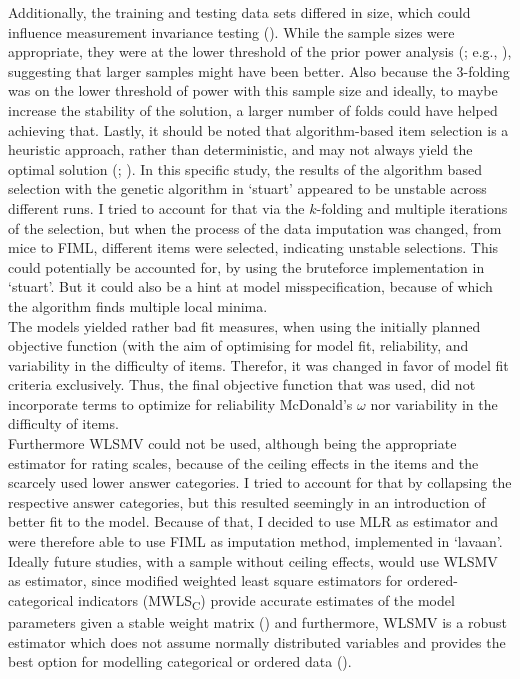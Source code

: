 \documentclass[
  12pt,
  a4paper,
  twoside]{article}
\begin{document}
Additionally, the training and testing data sets differed in size, which could influence measurement invariance testing (). While the sample sizes were appropriate, they were at the lower threshold of the prior power analysis (; e.g., ), suggesting that larger samples might have been better. Also because the 3-folding was on the lower threshold of power with this sample size and ideally, to maybe increase the stability of the solution, a larger number of folds could have helped achieving that. Lastly, it should be noted that algorithm-based item selection is a heuristic approach, rather than deterministic, and may not always yield the optimal solution (; ).
In this specific study, the results of the algorithm based selection with the genetic algorithm in `stuart' appeared to be unstable across different runs.
I tried to account for that via the \(k\)-folding and multiple iterations of the selection, but when the process of the data imputation was changed, from mice to FIML, different items were selected, indicating unstable selections.
This could potentially be accounted for, by using the bruteforce implementation in `stuart'.
But it could also be a hint at model misspecification, because of which the algorithm finds multiple local minima.\\
The models yielded rather bad fit measures, when using the initially planned objective function (with the aim of optimising for model fit, reliability, and variability in the difficulty of items.
Therefor, it was changed in favor of model fit criteria exclusively.
Thus, the final objective function that was used, did not incorporate terms to optimize for reliability McDonald's \(\omega\) nor variability in the difficulty of items.\\
Furthermore WLSMV could not be used, although being the appropriate estimator for rating scales, because of the ceiling effects in the items and the scarcely used lower answer categories.
I tried to account for that by collapsing the respective answer categories, but this resulted seemingly in an introduction of better fit to the model. Because of that, I decided to use MLR as estimator and were therefore able to use FIML as imputation method, implemented in `lavaan'.
Ideally future studies, with a sample without ceiling effects, would use WLSMV as estimator, since modified weighted least square estimators for ordered-categorical indicators (MWLS\textsubscript{C}) provide accurate estimates of the model parameters given a stable weight matrix () and furthermore, WLSMV is a robust estimator which does not assume normally distributed variables and provides the best option for modelling categorical or ordered data ().
\end{document}
